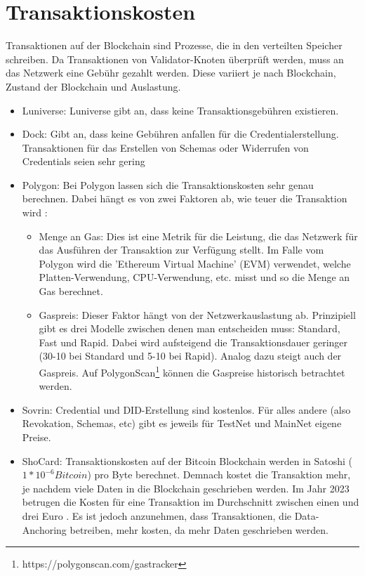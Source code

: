 \section{Transaktionskosten}
Transaktionen auf der Blockchain sind Prozesse, die in den verteilten Speicher schreiben. Da Transaktionen von Validator-Knoten überprüft werden, muss an das Netzwerk eine Gebühr gezahlt werden. Diese variiert je nach Blockchain, Zustand der Blockchain und Auslastung.
\begin{itemize}
	\item Luniverse: Luniverse gibt an, dass keine Transaktionsgebühren existieren.
	\item Dock: Gibt an, dass keine Gebühren anfallen für die Credentialerstellung. Transaktionen für das Erstellen von Schemas oder Widerrufen von Credentials seien sehr gering \cite{ID44}
	\item Polygon: Bei Polygon lassen sich die Transaktionskosten sehr genau berechnen. Dabei hängt es von zwei Faktoren ab, wie teuer die Transaktion wird \cite{ID45}:
	\begin{itemize}
		\item Menge an Gas: Dies ist eine Metrik für die Leistung, die das Netzwerk für das Ausführen der Transaktion zur Verfügung stellt. Im Falle vom Polygon wird die 'Ethereum Virtual Machine' (EVM) verwendet, welche Platten-Verwendung, CPU-Verwendung, etc. misst und so die Menge an Gas berechnet.
		\item Gaspreis: Dieser Faktor hängt von der Netzwerkauslastung ab. Prinzipiell gibt es drei Modelle zwischen denen man entscheiden muss: Standard, Fast und Rapid. Dabei wird aufsteigend die Transaktionsdauer geringer (30-10 bei Standard und 5-10 bei Rapid). Analog dazu steigt auch der Gaspreis. Auf PolygonScan\footnote{https://polygonscan.com/gastracker} können die Gaspreise historisch betrachtet werden.
	\end{itemize}
	\item Sovrin: Credential und DID-Erstellung sind kostenlos. Für alles andere (also Revokation, Schemas, etc) gibt es jeweils für TestNet und MainNet eigene Preise.
	\item ShoCard: Transaktionskosten auf der Bitcoin Blockchain werden in Satoshi ($1 * 10^{-6} Bitcoin$) pro Byte berechnet. Demnach kostet die Transaktion mehr, je nachdem viele Daten in die Blockchain geschrieben werden. Im Jahr 2023 betrugen die Kosten für eine Transaktion im Durchschnitt zwischen einen und drei Euro \cite{ID49}. Es ist jedoch anzunehmen, dass Transaktionen, die Data-Anchoring betreiben, mehr kosten, da mehr Daten geschrieben werden.
	
\end{itemize}

